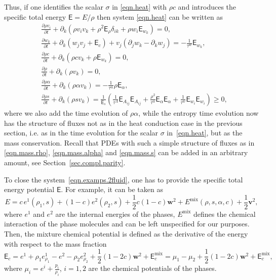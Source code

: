 \documentclass[twoside]{article}
\newcommand{\vv}{{\boldsymbol{v}}}
\newcommand{\ww}{{\boldsymbol{w}}}
\newcommand{\ted}{E} %
\newcommand{\tes}{\mathsf{E}} %
\newcommand{\pd}{\partial}
\begin{document}
Thus, if one identifies the scalar $ \sigma $ in \eqref{eqn.heat} with $ \rho c 
$ and introduces the specific total energy $ \tes = \ted/\rho $ then system 
\eqref{eqn.heat} can be written as
\begin{subequations}\label{eqn.examps.2fluid}
	\begin{align}
&\frac{\pd  \rho  v_i}{\pd  t} + \pd_k  (\rho  v_i v_k + \rho^2 
\tes_\rho 
\delta _{ik}+\rho  w_i\tes_{w_k}) = 0,\\[1mm]
&\frac{\pd w_k}{\pd  t} + \pd_k  
(w_j v_j+\tes_c) + v_j(\pd_j w_k - \pd_k w_j)=-\frac{1}{\tau 
^w}\tes_{w_k},\\[1mm]
 &\frac{\pd \rho  c}{\pd  t} + \pd_k  (\rho  c v_k + \rho\tes_{w_k}) = 0,\\[1mm]
 &\frac{\pd \rho  }{\pd  t} + \pd_k (\rho v_k ) = 0,\label{eqn.mass.rho}\\[1mm]
&\frac{\pd \rho  \alpha }{\pd  t} + \pd_k (\rho \alpha v_k) =-\frac{1}{\tau 
^{\alpha}}\rho \tes_{\alpha },\label{eqn.mass.alpha}\\[1mm]
&\frac{\pd \rho  s }{\pd  t} + \pd_k (\rho s v_k) = \frac{1}{\tes_s}\left ( 
\frac{1}{\tau^A}\tes_{A_{ij}}\tes_{A_{ij}} + \frac{\rho^2}{\tau ^{\alpha
}} \tes_{\alpha } \tes_\alpha + \frac{1}{\tau ^w}\tes_{w_i} \tes_{w_i}\right ) 
\geq 0,\label{eqn.mass.s}
	\end{align}
\end{subequations}
where we also add the time evolution of $ \rho\alpha $, while the entropy 
time evolution 
now has the structure of fluxes not as in the heat conduction case in the 
previous section, i.e. as in 
the time evolution for the scalar $ \sigma $ in~\eqref{eqn.heat}, but as the 
mass conservation. Recall that PDEs with such a simple structure of fluxes as  
in \eqref{eqn.mass.rho}, \eqref{eqn.mass.alpha} and \eqref{eqn.mass.s} can be 
added in an arbitrary amount, see 
Section~\ref{sec.compl.parity}.

To close the system~\eqref{eqn.examps.2fluid}, one has to provide the specific 
total energy potential $ \tes $. For example, it can be taken as
\begin{equation}
E= c\, e^1\left(\rho _1,s\right)+(1-c)e^2\left(\rho 
_2,s\right)+\frac{1}{2}c(1-c) \ww^2 + E^{\text{mix}}(\rho 
,s,\alpha ,c) + \frac{1}{2}\vv^2,
\end{equation}
where $ e^1 $ and $ e^2 $ are the internal energies of the phases, $ 
E^{\text{mix}} $ defines the chemical interaction of the phase 
molecules and can be left unspecified for our purposes. Then, the mixture 
chemical potential is defined as the derivative of the energy with 
respect to the mass fraction
\begin{equation}
\tes_c=e^1+\rho _1 e_{\rho _1}^1-e^2-\rho _2 e_{\rho 
_2}^2+\frac{1}{2}(1-2c)\ww^2+\tes_c^{\text{mix}}=\mu _1-\mu 
_2+\frac{1}{2}(1-2c)\ww^2+\tes_c^{\text{mix}},
\end{equation}
where $\mu _i=e^i+\frac{p_i}{\rho _i}$, $i=1,2$ are the chemical 
potentials of 
the phases.
\end{document}
